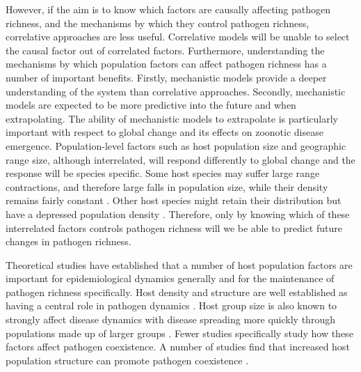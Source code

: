 However, if the aim is to know which factors are causally affecting pathogen richness, and the mechanisms by which they control pathogen richness, correlative approaches are less useful.
Correlative models will be unable to select the causal factor out of correlated factors.
Furthermore, understanding the mechanisms by which population factors can affect pathogen richness has a number of important benefits.
Firstly, mechanistic models provide a deeper understanding of the system than correlative approaches.
Secondly, mechanistic models are expected to be more predictive into the future and when extrapolating.
The ability of mechanistic models to extrapolate is particularly important with respect to global change and its effects on zoonotic disease emergence.
Population-level factors such as host population size and geographic range size, although interrelated, will respond differently to global change and the response will be species specific.
Some host species may suffer large range contractions, and therefore large falls in population size, while their density remains fairly constant \cite{thomas2004extinction}.
Other host species might retain their distribution but have a depressed population density \cite{craigie2010large}.
Therefore, only by knowing which of these interrelated factors controls pathogen richness will we be able to predict future changes in pathogen richness.



Theoretical studies have established that a number of host population factors are important for epidemiological dynamics generally and for the maintenance of pathogen richness specifically.
Host density and structure are well established as having a central role in pathogen dynamics \cite{colizza2007invasion, barthelemy2010fluctuation, wu2013threshold, may1979population, anderson1979population}.
Host group size is also known to strongly affect disease dynamics with disease spreading more quickly through populations made up of larger groups \cite{colizza2007invasion}.
Fewer studies specifically study how these factors affect pathogen coexistence.
A number of studies find that increased host population structure can promote pathogen coexistence \cite{qiu2013vector, allen2004sis, nunes2006localized}.

